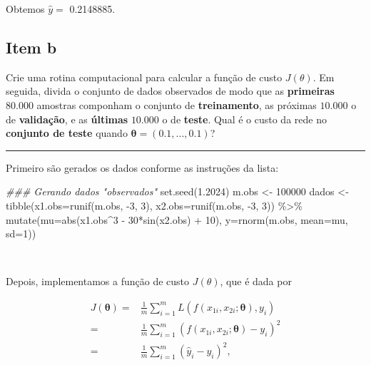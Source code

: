 \documentclass[
  a4paperpaper,
]{article}
\newenvironment{Shaded}{\begin{snugshade}}{\end{snugshade}}
\newcommand{\AttributeTok}[1]{\textcolor[rgb]{0.40,0.45,0.13}{#1}}
\newcommand{\DecValTok}[1]{\textcolor[rgb]{0.68,0.00,0.00}{#1}}
\newcommand{\DocumentationTok}[1]{\textcolor[rgb]{0.37,0.37,0.37}{\textit{#1}}}
\newcommand{\FloatTok}[1]{\textcolor[rgb]{0.68,0.00,0.00}{#1}}
\newcommand{\FunctionTok}[1]{\textcolor[rgb]{0.28,0.35,0.67}{#1}}
\newcommand{\NormalTok}[1]{\textcolor[rgb]{0.00,0.23,0.31}{#1}}
\newcommand{\OtherTok}[1]{\textcolor[rgb]{0.00,0.23,0.31}{#1}}
\newcommand{\SpecialCharTok}[1]{\textcolor[rgb]{0.37,0.37,0.37}{#1}}
\begin{document}
Obtemos \(\hat{y} =\) 0.2148885.

\subsection{Item b}\label{item-b}

Crie uma rotina computacional para calcular a função de custo
\(J(\theta)\). Em seguida, divida o conjunto de dados observados de modo
que as \textbf{primeiras} \(80.000\) amostras componham o conjunto de
\textbf{treinamento}, as próximas \(10.000\) o de \textbf{validação}, e
as \textbf{últimas} \(10.000\) o de \textbf{teste}. Qual é o custo da
rede no \textbf{conjunto de teste} quando
\(\boldsymbol{\theta} = (0.1, . . . , 0.1)\)?

\begin{center}\rule{0.5\linewidth}{0.5pt}\end{center}

Primeiro são gerados os dados conforme as instruções da lista:

\begin{Shaded}
\begin{Highlighting}[]
\DocumentationTok{\#\#\# Gerando dados "observados"}
\FunctionTok{set.seed}\NormalTok{(}\FloatTok{1.2024}\NormalTok{)}
\NormalTok{m.obs }\OtherTok{\textless{}{-}} \DecValTok{100000}
\NormalTok{dados }\OtherTok{\textless{}{-}} \FunctionTok{tibble}\NormalTok{(}\AttributeTok{x1.obs=}\FunctionTok{runif}\NormalTok{(m.obs, }\SpecialCharTok{{-}}\DecValTok{3}\NormalTok{, }\DecValTok{3}\NormalTok{),}
                \AttributeTok{x2.obs=}\FunctionTok{runif}\NormalTok{(m.obs, }\SpecialCharTok{{-}}\DecValTok{3}\NormalTok{, }\DecValTok{3}\NormalTok{)) }\SpecialCharTok{\%\textgreater{}\%}
         \FunctionTok{mutate}\NormalTok{(}\AttributeTok{mu=}\FunctionTok{abs}\NormalTok{(x1.obs}\SpecialCharTok{\^{}}\DecValTok{3} \SpecialCharTok{{-}} \DecValTok{30}\SpecialCharTok{*}\FunctionTok{sin}\NormalTok{(x2.obs) }\SpecialCharTok{+} \DecValTok{10}\NormalTok{), }
                \AttributeTok{y=}\FunctionTok{rnorm}\NormalTok{(m.obs, }\AttributeTok{mean=}\NormalTok{mu, }\AttributeTok{sd=}\DecValTok{1}\NormalTok{))}
\end{Highlighting}
\end{Shaded}

~

Depois, implementamos a função de custo \(J(\theta)\), que é dada por

\begin{align*}
  J(\boldsymbol{\theta}) =& \frac{1}{m}\sum\limits_{i = 1}^{m} L \left( f(x_{1i}, x_{2i}; \boldsymbol{\theta}), y_i \right) \\ 
  =& \frac{1}{m}\sum\limits_{i = 1}^{m} \left( f(x_{1i}, x_{2i}; \boldsymbol{\theta}) - y_i \right)^2 \\ 
  =& \frac{1}{m}\sum\limits_{i = 1}^{m} \left( \hat{y}_i - y_i \right)^2,
\end{align*}
\end{document}
